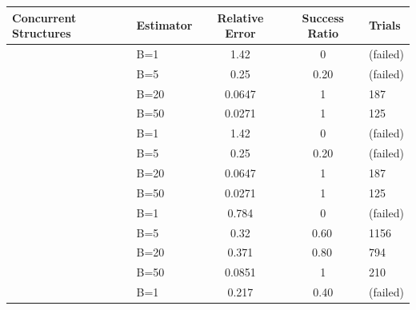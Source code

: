 
\begin{table}[t]
  \centering
  \tiny
  \begin{tabular}{@{} l l S[scientific-notation=true] S[table-format=1.2] l @{}}
    \toprule
    \textbf{Concurrent Structures} & \textbf{Estimator} & \textbf{Relative Error} & \textbf{Success Ratio} & \textbf{Trials} \\
    \midrule

    &  B=1 & \num{1.42} & \num{0} & (failed) \\
    &  B=5      & \num{0.25} & \num{0.20} & (failed) \\
    &  B=20     & \num{0.0647} & {1 } & \num{187} \\
    &  B=50     & \num{0.0271} & {1} & \num{125} \\
    \midrule
     &  B=1 & \num{1.42} & \num{0} & (failed) \\
    &  B=5      & \num{0.25} & \num{0.20} & (failed) \\
    &  B=20     & \num{0.0647} & {1} & \num{187} \\
    &  B=50     & \num{0.0271} & {1} & \num{125} \\
    \midrule
      & B=1 & \num{0.784} & \num{0} & (failed) \\
    &  B=5      & \num{0.32} & {\num{0.60}\,} & \num{1156} \\
    &  B=20     & \num{0.371} & {\num{0.80}\,} & \num{794} \\
    &  B=50     & \num{0.0851} & {1} & \num{210} \\
    \midrule
     &  B=1             & \num{0.217} & \num{0.40} & (failed) \\

\end{tabular}
\end{table}
